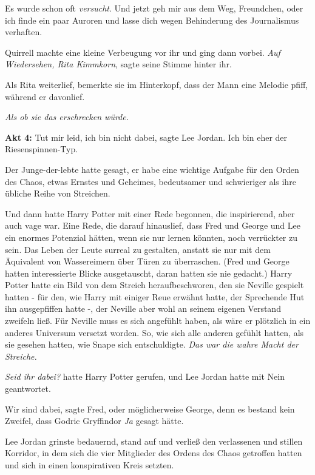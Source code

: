 \glqq{}Es wurde schon oft \emph{versucht}. Und jetzt geh mir aus dem Weg,
Freundchen, oder ich finde ein paar Auroren und lasse dich wegen Behinderung des
Journalismus verhaften.\grqq{}

Quirrell machte eine kleine Verbeugung vor ihr und ging dann vorbei. \glqq{}
\emph{Auf Wiedersehen, Rita Kimmkorn}\grqq{}, sagte seine Stimme hinter ihr.

Als Rita weiterlief, bemerkte sie im Hinterkopf, dass der Mann eine Melodie
pfiff, während er davonlief.

\emph{Als ob sie das erschrecken würde.}

\textbf{Akt 4:}
\glqq{}Tut mir leid, ich bin nicht dabei\grqq{}, sagte Lee Jordan. \glqq{}Ich
bin eher der Riesenspinnen-Typ.\grqq{}

Der Junge-der-lebte hatte gesagt, er habe eine wichtige Aufgabe für den Orden
des Chaos, etwas Ernstes und Geheimes, bedeutsamer und schwieriger als ihre
übliche Reihe von Streichen.

Und dann hatte Harry Potter mit einer Rede begonnen, die inspirierend, aber auch
vage war. Eine Rede, die darauf hinauslief, dass Fred und George und Lee ein
enormes Potenzial hätten, wenn sie nur lernen könnten, noch verrückter zu sein.
Das Leben der Leute surreal zu gestalten, anstatt sie nur mit dem Äquivalent von
Wassereimern über Türen zu überraschen. (Fred und George hatten interessierte
Blicke ausgetauscht, daran hatten sie nie gedacht.) Harry Potter hatte ein Bild
von dem Streich heraufbeschworen, den sie Neville gespielt hatten - für den, wie
Harry mit einiger Reue erwähnt hatte, der Sprechende Hut ihn ausgepfiffen hatte
-, der Neville aber wohl an seinem eigenen Verstand zweifeln ließ. Für Neville
muss es sich angefühlt haben, als wäre er plötzlich in ein anderes Universum
versetzt worden. So, wie sich alle anderen gefühlt hatten, als sie gesehen
hatten, wie Snape sich entschuldigte. \emph{Das war die wahre Macht der
Streiche.}

\emph{Seid ihr dabei?} hatte Harry Potter gerufen, und Lee Jordan hatte mit Nein
geantwortet.

\glqq{}Wir sind dabei\grqq{}, sagte Fred, oder möglicherweise George, denn es
bestand kein Zweifel, dass Godric Gryffindor \emph{Ja} gesagt hätte.

Lee Jordan grinste bedauernd, stand auf und verließ den verlassenen und stillen
Korridor, in dem sich die vier Mitglieder des Ordens des Chaos getroffen hatten
und sich in einen konspirativen Kreis setzten.

